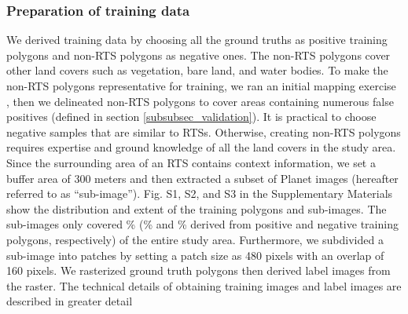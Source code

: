 \documentclass[authoryear,preprint,review,12pt]{elsarticle}
\begin{document}
\subsubsection{Preparation of training data}
\label{subsubsec_pre_trainingdata}

We derived training data by choosing all the ground truths as positive training polygons and  non-RTS polygons as negative ones. The non-RTS polygons cover other land covers such as vegetation, bare land, and water bodies. To make the non-RTS polygons representative for training, we ran an initial mapping exercise , then we delineated non-RTS polygons to cover areas containing numerous false positives (defined in section \ref{subsubsec_validation}). It is practical to choose negative samples that are similar to RTSs. Otherwise, creating non-RTS polygons requires expertise and ground knowledge of all the land covers in the study area. Since the surrounding area of an RTS contains context information, we set a buffer area of 300 meters and then extracted a subset of Planet images (hereafter referred to as “sub-image”). Fig. S1, S2, and S3 in the Supplementary Materials show the distribution and extent of the training polygons and sub-images. The sub-images only covered \% (\% and \% derived from positive and negative training polygons, respectively) of the entire study area. Furthermore, we subdivided a sub-image into patches by setting a patch size as 480 pixels with an overlap of 160 pixels.  We rasterized ground truth polygons then derived label images from the raster. The technical details of obtaining training images and label images are described in greater detail   
\end{document}
